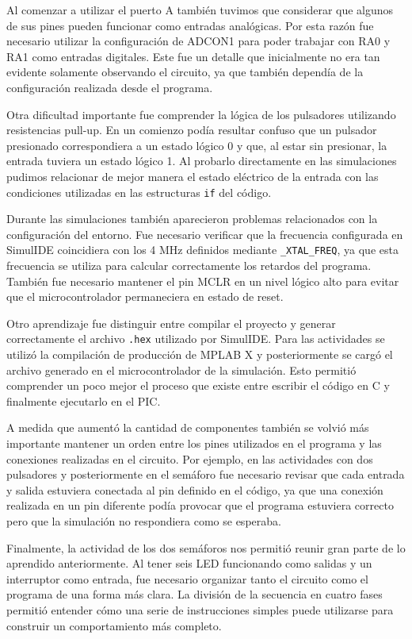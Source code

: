 \documentclass[12pt,a4paper]{article}
\begin{document}
Al comenzar a utilizar el puerto A también tuvimos que considerar que algunos de sus pines pueden funcionar como entradas analógicas. Por esta razón fue necesario utilizar la configuración de ADCON1 para poder trabajar con RA0 y RA1 como entradas digitales. Este fue un detalle que inicialmente no era tan evidente solamente observando el circuito, ya que también dependía de la configuración realizada desde el programa.

Otra dificultad importante fue comprender la lógica de los pulsadores utilizando resistencias pull-up. En un comienzo podía resultar confuso que un pulsador presionado correspondiera a un estado lógico 0 y que, al estar sin presionar, la entrada tuviera un estado lógico 1. Al probarlo directamente en las simulaciones pudimos relacionar de mejor manera el estado eléctrico de la entrada con las condiciones utilizadas en las estructuras \texttt{if} del código.

Durante las simulaciones también aparecieron problemas relacionados con la configuración del entorno. Fue necesario verificar que la frecuencia configurada en SimulIDE coincidiera con los 4 MHz definidos mediante \texttt{\_XTAL\_FREQ}, ya que esta frecuencia se utiliza para calcular correctamente los retardos del programa. También fue necesario mantener el pin MCLR en un nivel lógico alto para evitar que el microcontrolador permaneciera en estado de reset.

Otro aprendizaje fue distinguir entre compilar el proyecto y generar correctamente el archivo \texttt{.hex} utilizado por SimulIDE. Para las actividades se utilizó la compilación de producción de MPLAB X y posteriormente se cargó el archivo generado en el microcontrolador de la simulación. Esto permitió comprender un poco mejor el proceso que existe entre escribir el código en C y finalmente ejecutarlo en el PIC.

A medida que aumentó la cantidad de componentes también se volvió más importante mantener un orden entre los pines utilizados en el programa y las conexiones realizadas en el circuito. Por ejemplo, en las actividades con dos pulsadores y posteriormente en el semáforo fue necesario revisar que cada entrada y salida estuviera conectada al pin definido en el código, ya que una conexión realizada en un pin diferente podía provocar que el programa estuviera correcto pero que la simulación no respondiera como se esperaba.

Finalmente, la actividad de los dos semáforos nos permitió reunir gran parte de lo aprendido anteriormente. Al tener seis LED funcionando como salidas y un interruptor como entrada, fue necesario organizar tanto el circuito como el programa de una forma más clara. La división de la secuencia en cuatro fases permitió entender cómo una serie de instrucciones simples puede utilizarse para construir un comportamiento más completo.
\end{document}
